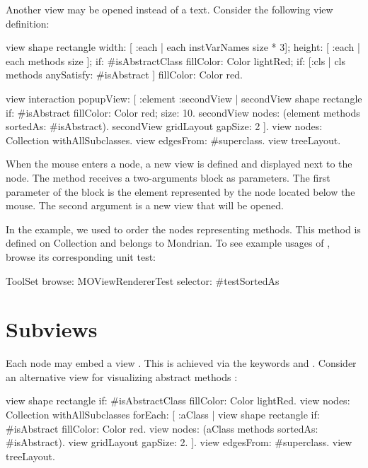 \documentclass[a4paper,10pt,twoside]{book}
\begin{document}
Another view may be opened instead of a text. Consider the following view definition: 

\begin{code}{}
view shape rectangle
  width: [ :each | each instVarNames size * 3];
  height: [ :each | each methods size ];
  if: #isAbstractClass fillColor: Color lightRed;
  if: [:cls | cls methods anySatisfy: #isAbstract ] fillColor: Color red.
  
view interaction popupView: [ :element :secondView | 
  secondView shape rectangle 
    if: #isAbstract fillColor: Color red;
    size: 10.  
  secondView nodes: (element methods sortedAs: #isAbstract).
  secondView gridLayout gapSize: 2
  ].
view nodes: Collection withAllSubclasses.
view edgesFrom: #superclass.
view treeLayout.
\end{code}

When the mouse enters a node, a new view is defined and displayed next to the node. The method  receives a two-arguments block as parameters. The first parameter of the block is the element represented by the node located below the mouse. The second argument is a new view that will be opened.

In the example, we used  to order the nodes representing methods. This method is defined on Collection and belongs to Mondrian. To see example usages of , browse its corresponding unit test:
\begin{code}{}
ToolSet browse: MOViewRendererTest selector: #testSortedAs 
\end{code}

\section{Subviews}

Each node may embed a view . This is achieved via the keywords  and . Consider an alternative view for visualizing abstract methods :

\begin{code}{}
view shape rectangle
  if: #isAbstractClass fillColor: Color lightRed.
view nodes: Collection withAllSubclasses forEach: [ :aClass | 
  view shape rectangle 
    if: #isAbstract fillColor: Color red.
  view nodes: (aClass methods sortedAs: #isAbstract).
  view gridLayout gapSize: 2. 
].
view edgesFrom: #superclass.
view treeLayout.
\end{code}
\end{document}
